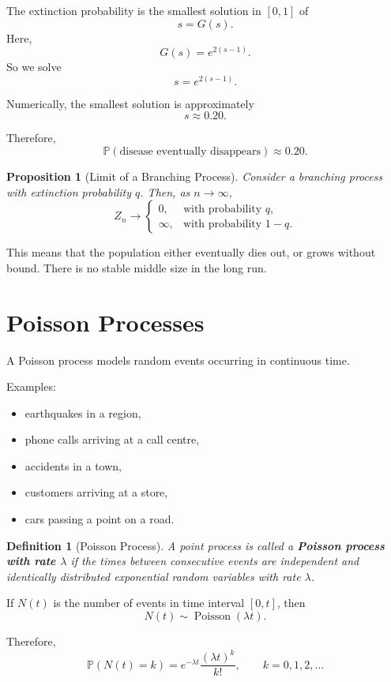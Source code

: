 \documentclass[12pt,a4paper]{article}
\theoremstyle{lecturestyle}
\newtheorem{definition}{Definition}
\newtheorem{proposition}{Proposition}
\newcommand{\Prob}{\mathbb{P}}
\begin{document}
The extinction probability is the smallest solution in $[0,1]$ of
\[
s=G(s).
\]
Here,
\[
G(s)=e^{2(s-1)}.
\]
So we solve
\[
s=e^{2(s-1)}.
\]

Numerically, the smallest solution is approximately
\[
s\approx 0.20.
\]

Therefore,
\[
\boxed{\Prob(\text{disease eventually disappears})\approx 0.20.}
\]

\begin{proposition}[Limit of a Branching Process]
Consider a branching process with extinction probability $q$. Then, as $n\to\infty$,
\[
Z_n\to
\begin{cases}
0, & \text{with probability }q,\\
\infty, & \text{with probability }1-q.
\end{cases}
\]
\end{proposition}

This means that the population either eventually dies out, or grows without bound. There is no stable middle size in the long run.

\section{Poisson Processes}

A Poisson process models random events occurring in continuous time.

Examples:
\begin{itemize}[leftmargin=1.2cm]
    \item earthquakes in a region,
    \item phone calls arriving at a call centre,
    \item accidents in a town,
    \item customers arriving at a store,
    \item cars passing a point on a road.
\end{itemize}

\begin{definition}[Poisson Process]
A point process is called a \textbf{Poisson process with rate $\lambda$} if the times between consecutive events are independent and identically distributed exponential random variables with rate $\lambda$.
\end{definition}

If $N(t)$ is the number of events in time interval $[0,t]$, then
\[
N(t)\sim \operatorname{Poisson}(\lambda t).
\]

Therefore,
\[
\Prob(N(t)=k)=e^{-\lambda t}\frac{(\lambda t)^k}{k!},
\qquad k=0,1,2,\ldots
\]
\end{document}
